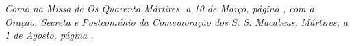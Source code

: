 
\textit{Como na Missa de Os Quarenta Mártires, a 10 de Março, página \pageref{quarentamartires}, com a Oração, Secreta e Postcomúnio da Comemoração dos S. S. Macabeus, Mártires, a 1 de Agosto, página \pageref{macabeus}.}